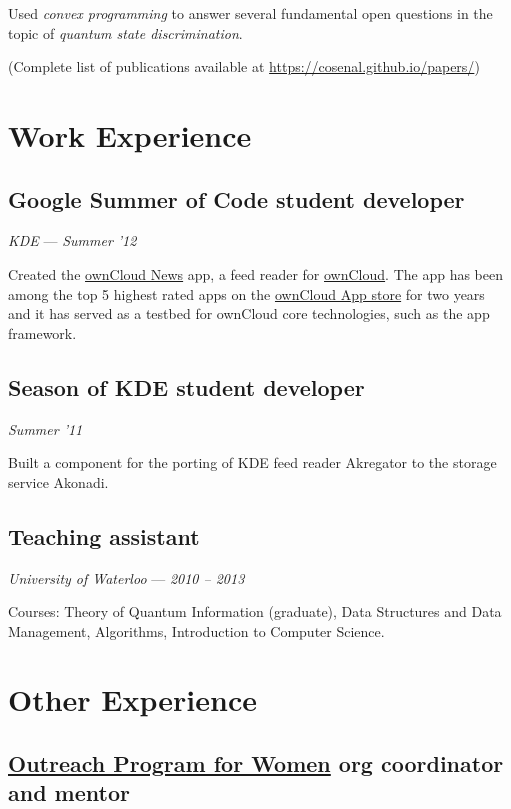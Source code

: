 \documentclass[]{article}
\begin{document}
Used \emph{convex programming} to answer several fundamental open
questions in the topic of \emph{quantum state discrimination}.

(Complete list of publications available at
\url{https://cosenal.github.io/papers/})

\section{Work Experience}\label{work-experience}

\subsection{Google Summer of Code student
developer}\label{google-summer-of-code-student-developer}

\emph{KDE} --- \emph{Summer '12}

Created the \href{https://github.com/owncloud/news}{ownCloud News} app,
a feed reader for \href{http://owncloud.org/}{ownCloud}. The app has
been among the top 5 highest rated apps on the
\href{http://apps.owncloud.com/index.php?xsortmode=high}{ownCloud App
store} for two years and it has served as a testbed for ownCloud core
technologies, such as the app framework.

\subsection{Season of KDE student
developer}\label{season-of-kde-student-developer}

\emph{Summer '11}

Built a component for the porting of KDE feed reader Akregator to the
storage service Akonadi.

\subsection{Teaching assistant}\label{teaching-assistant}

\emph{University of Waterloo} --- \emph{2010 -- 2013}

Courses: Theory of Quantum Information (graduate), Data Structures and
Data Management, Algorithms, Introduction to Computer Science.

\section{Other Experience}\label{other-experience}

\subsection{\href{https://gnome.org/opw/}{Outreach Program for Women}
org coordinator and
mentor}\label{outreach-program-for-womenopw-org-coordinator-and-mentor}
\end{document}
